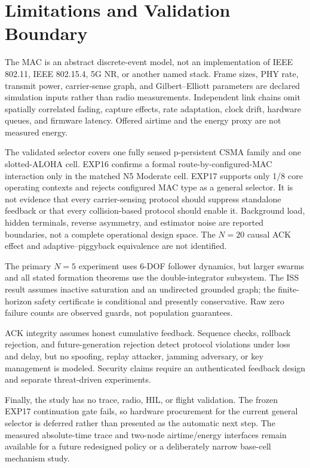 \section{Limitations and Validation Boundary}
\label{sec:s2-limitations}

The MAC is an abstract discrete-event model, not an implementation of IEEE
802.11, IEEE 802.15.4, 5G NR, or another named stack. Frame sizes, PHY rate,
transmit power, carrier-sense graph, and Gilbert--Elliott parameters are
declared simulation inputs rather than radio measurements. Independent link
chains omit spatially correlated fading, capture effects, rate adaptation,
clock drift, hardware queues, and firmware latency. Offered airtime and the
energy proxy are not measured energy.

The validated selector covers one fully sensed p-persistent CSMA family and
one slotted-ALOHA cell. EXP16 confirms a formal route-by-configured-MAC
interaction only in the matched N5 Moderate cell. EXP17 supports only 1/8
core operating contexts and rejects configured MAC type as a general selector.
It is not evidence that every carrier-sensing protocol
should suppress standalone feedback or that every collision-based protocol
should enable it. Background load, hidden terminals, reverse asymmetry, and
estimator noise are reported boundaries, not a complete operational design
space. The $N=20$ causal ACK effect and adaptive--piggyback equivalence are not
identified.

The primary $N=5$ experiment uses 6-DOF follower dynamics, but larger swarms
and all stated formation theorems use the double-integrator subsystem. The ISS
result assumes inactive saturation and an undirected grounded graph; the
finite-horizon safety certificate is conditional and presently conservative.
Raw zero failure counts are observed guards, not population guarantees.

ACK integrity assumes honest cumulative feedback. Sequence checks, rollback
rejection, and future-generation rejection detect protocol violations under
loss and delay, but no spoofing, replay attacker, jamming adversary, or key
management is modeled. Security claims require an authenticated feedback
design and separate threat-driven experiments.

Finally, the study has no trace, radio, HIL, or flight validation. The frozen
EXP17 continuation gate fails, so hardware procurement for the current general
selector is deferred rather than presented as the automatic next step. The
measured absolute-time trace and two-node airtime/energy interfaces remain
available for a future redesigned policy or a deliberately narrow base-cell
mechanism study.

